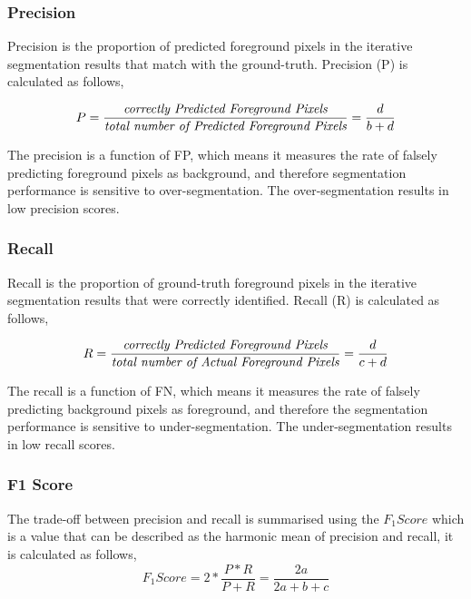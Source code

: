 \documentclass{WitsPhysicsReport}
\begin{document}
\subsubsection{Precision}
Precision is the proportion of predicted foreground pixels in the iterative segmentation results that match with the ground-truth. Precision (P) is calculated as follows,

\begin{equation}
    P = \frac{\textit{\text{correctly Predicted Foreground Pixels}}}{\textit{\text{total number of Predicted Foreground Pixels}}} = \frac{d}{b+d} 
     \label{equ:precision}
\end{equation}

The precision is a function of FP, which means it measures the rate of falsely predicting foreground pixels as background, and therefore segmentation performance is sensitive to over-segmentation. The over-segmentation results in low precision scores.

\subsubsection{Recall}
Recall is the proportion of ground-truth foreground pixels in the iterative segmentation results that were correctly identified. Recall (R) is calculated as follows,

\begin{equation}
    R =  \frac{\textit{\text{correctly Predicted Foreground Pixels}}}{\textit{\text{total number of Actual Foreground Pixels}}} = \frac{d}{c+d}
    \label{equ:recall}
\end{equation}

The recall is a function of FN, which means it measures the rate of falsely predicting background pixels as foreground, and therefore the segmentation performance is sensitive to under-segmentation. The under-segmentation results in low recall scores.

\subsubsection{ F1 Score}
The trade-off between precision and recall is summarised using the $F_{1}Score$
which is a value that can be described as the harmonic mean of precision and recall, it is calculated as follows, 
\begin{equation}
    F_{1}Score = 2*\frac{P*R}{P+R} = \frac{2a}{2a + b + c }
     \label{equ:f1}
\end{equation}
\end{document}
